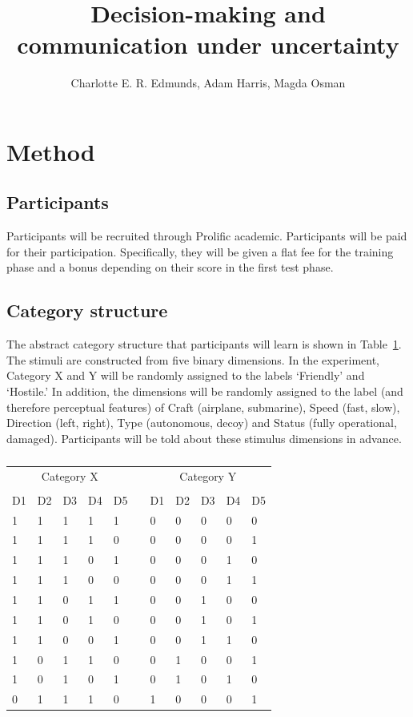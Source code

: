 \documentclass[doc, a4paper, apacite]{apa6}
\title{Decision-making and communication under uncertainty}
\author{Charlotte E. R. Edmunds, Adam Harris, Magda Osman}
\affiliation{Queen Mary, UCL, University of London \\ 11 January 2021}
\begin{document}
	\doublespacing

\section{Method}

\subsection{Participants}
Participants will be recruited through Prolific academic.
Participants will be paid for their participation. 
Specifically, they will be given a flat fee for the training phase and a bonus depending on their score in the first test phase. 

\subsection{Category structure}
The abstract category structure that participants will learn is shown in Table~\ref{table:abstractStructure}. 
The stimuli are constructed from five binary dimensions. 
In the experiment, Category X and Y will be randomly assigned to the labels `Friendly' and `Hostile.' 
In addition, the dimensions will be randomly assigned to the label (and therefore perceptual features) of Craft (airplane, submarine), Speed (fast, slow), Direction (left, right), Type (autonomous, decoy) and Status (fully operational, damaged). 
Participants will be told about these stimulus dimensions in advance. 

\begin{table}
	\centering
	\caption{}
	\label{table:abstractStructure}
	\begin{tabular}{lllllllllll}
		\toprule
		\multicolumn{5}{c}{Category X} &  & \multicolumn{5}{c}{Category Y} \\
		\cline{1-5} \cline{7-11} \\
		D1   & D2   & D3   & D4  & D5  &  & D1   & D2   & D3   & D4  & D5  \\
		\midrule
		1    & 1    & 1    & 1   & 1   &  & 0    & 0    & 0    & 0   & 0   \\
		1    & 1    & 1    & 1   & 0   &  & 0    & 0    & 0    & 0   & 1   \\
		1    & 1    & 1    & 0   & 1   &  & 0    & 0    & 0    & 1   & 0   \\
		1    & 1    & 1    & 0   & 0   &  & 0    & 0    & 0    & 1   & 1   \\
		1    & 1    & 0    & 1   & 1   &  & 0    & 0    & 1    & 0   & 0   \\
		1    & 1    & 0    & 1   & 0   &  & 0    & 0    & 1    & 0   & 1   \\
		1    & 1    & 0    & 0   & 1   &  & 0    & 0    & 1    & 1   & 0   \\
		1    & 0    & 1    & 1   & 0   &  & 0    & 1    & 0    & 0   & 1   \\
		1    & 0    & 1    & 0   & 1   &  & 0    & 1    & 0    & 1   & 0   \\
		0    & 1    & 1    & 1   & 0   &  & 1    & 0    & 0    & 0   & 1   \\
		\bottomrule
	\end{tabular}	
\end{table}
\end{document}
